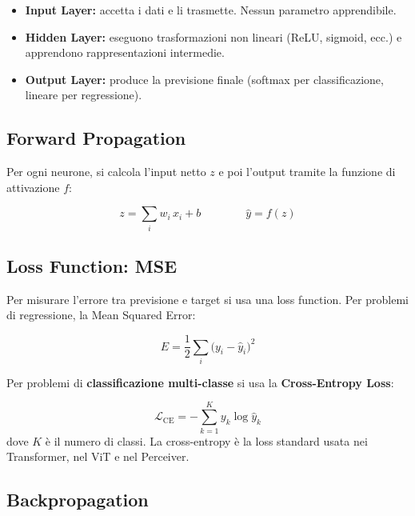 \documentclass[
  11pt,
]{article}
\begin{document}
\begin{itemize}
\item \textbf{Input Layer:} accetta i dati e li trasmette. Nessun parametro apprendibile.
\item \textbf{Hidden Layer:} eseguono trasformazioni non lineari (ReLU, sigmoid, ecc.) e apprendono rappresentazioni intermedie.
\item \textbf{Output Layer:} produce la previsione finale (softmax per classificazione, lineare per regressione).
\end{itemize}

\subsection{Forward Propagation}

Per ogni neurone, si calcola l'input netto $z$ e poi l'output tramite la funzione di attivazione $f$:

\begin{formulabox}[title={\textbf{Forward pass di un neurone}}]
\[
z = \sum_{i} w_i \, x_i + b \qquad\qquad \hat{y} = f(z)
\]
\end{formulabox}

\subsection{Loss Function: MSE}
\label{app:loss}

Per misurare l'errore tra previsione e target si usa una loss function. Per problemi di regressione, la Mean Squared Error:

\begin{formulabox}[title={\textbf{Mean Squared Error}}]
\[
E = \frac{1}{2}\sum_{i}\bigl(y_i - \hat{y}_i\bigr)^{2}
\]
\end{formulabox}

Per problemi di \textbf{classificazione multi-classe} si usa la \textbf{Cross-Entropy Loss}:

\[
\mathcal{L}_{\text{CE}} = -\sum_{k=1}^{K} y_k \log \hat{y}_k
\]
dove $K$ è il numero di classi. La cross-entropy è la loss standard usata nei Transformer, nel ViT e nel Perceiver.

\subsection{Backpropagation}
\label{app:backprop}
\end{document}

